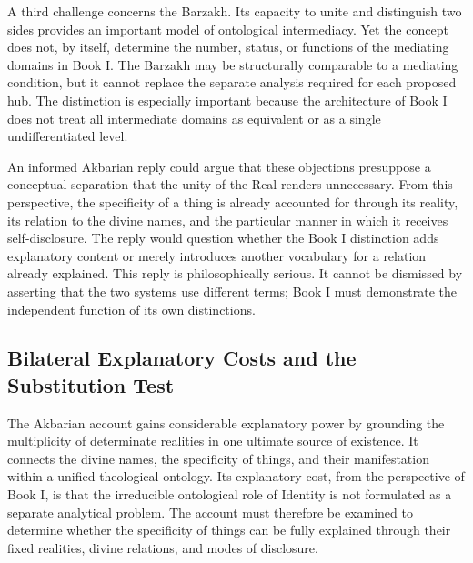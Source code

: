 \label{para:VS.B01.P01.C08.SS15.P003}

A third challenge concerns the Barzakh.
Its capacity to unite and distinguish two
sides provides an important model of
ontological intermediacy. Yet the concept
does not, by itself, determine the number,
status, or functions of the mediating
domains in Book I. The Barzakh may be
structurally comparable to a mediating
condition, but it cannot replace the
separate analysis required for each
proposed hub. The distinction is especially
important because the architecture of
Book I does not treat all intermediate
domains as equivalent or as a single
undifferentiated level.

\label{para:VS.B01.P01.C08.SS15.P004}

An informed Akbarian reply could argue that
these objections presuppose a conceptual
separation that the unity of the Real
renders unnecessary. From this perspective,
the specificity of a thing is already
accounted for through its reality, its
relation to the divine names, and the
particular manner in which it receives
self-disclosure. The reply would question
whether the Book I distinction adds
explanatory content or merely introduces
another vocabulary for a relation already
explained. This reply is philosophically
serious. It cannot be dismissed by asserting
that the two systems use different terms;
Book I must demonstrate the independent
function of its own distinctions.



\subsection{Bilateral Explanatory Costs and the Substitution Test}
\label{subsec:ch08_s16_ss16}

\label{para:VS.B01.P01.C08.S16.SS16.P001}

The Akbarian account gains considerable
explanatory power by grounding the multiplicity
of determinate realities in one ultimate
source of existence. It connects the divine
names, the specificity of things, and their
manifestation within a unified theological
ontology. Its explanatory cost, from the
perspective of Book I, is that the irreducible
ontological role of Identity is not formulated
as a separate analytical problem. The account
must therefore be examined to determine
whether the specificity of things can be
fully explained through their fixed realities,
divine relations, and modes of disclosure.

